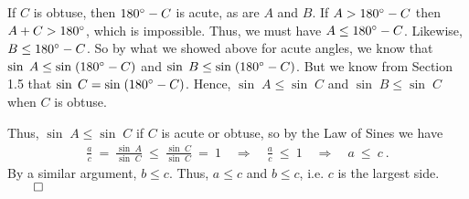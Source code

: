 If $C$ is obtuse, then $180^\circ - C$ is acute, as are $A$ and $B$. If $A > 180^\circ - C$
then $A + C > 180^\circ$, which is impossible. Thus, we must have $A \le 180^\circ - C$.
Likewise, $B \le 180^\circ - C$. So by what we showed above for acute angles, we know that
$\sin\;A \le \sin\;(180^\circ - C)$ and $\sin\;B \le \sin\;(180^\circ - C)$.
But we know from Section 1.5 that $\sin\;C = \sin\;(180^\circ - C)$. Hence, $\sin\;A \le \sin\;C$
and $\sin\;B \le \sin\;C$ when $C$ is obtuse.

Thus, $\sin\;A \le \sin\;C$ if $C$ is acute or obtuse, so by the Law of Sines we have
\begin{align*}
 \frac{a}{c} ~=~ \frac{\sin\;A}{\sin\;C} ~\le~ \frac{\sin\;C}{\sin\;C} ~=~ 1 \quad\Rightarrow\quad
 \frac{a}{c} ~\le~ 1 \quad\Rightarrow\quad a ~\le~ c ~.
\end{align*}
By a similar argument, $b \le c$. Thus, $a \le c$ and $b \le c$, i.e. $c$ is the largest
side. $\qed$

\vspace{1mm}
\divider
\vspace{3mm}

